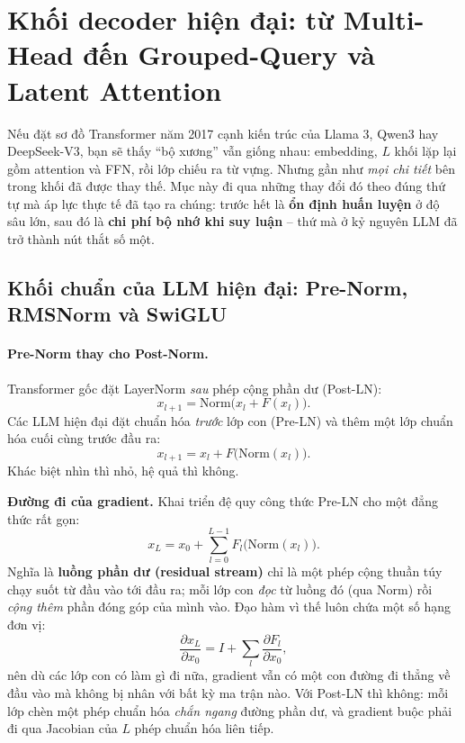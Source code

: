 
\section{Khối decoder hiện đại: từ Multi-Head đến Grouped-Query và Latent Attention}
\label{sec:modern_decoder_attention}

Nếu đặt sơ đồ Transformer năm 2017 cạnh kiến trúc của Llama 3, Qwen3 hay DeepSeek-V3, bạn sẽ thấy “bộ xương” vẫn giống nhau: embedding, $L$ khối lặp lại gồm attention và FFN, rồi lớp chiếu ra từ vựng. Nhưng gần như \emph{mọi chi tiết} bên trong khối đã được thay thế. Mục này đi qua những thay đổi đó theo đúng thứ tự mà áp lực thực tế đã tạo ra chúng: trước hết là \textbf{ổn định huấn luyện} ở độ sâu lớn, sau đó là \textbf{chi phí bộ nhớ khi suy luận} -- thứ mà ở kỷ nguyên LLM đã trở thành nút thắt số một.

\subsection{Khối chuẩn của LLM hiện đại: Pre-Norm, RMSNorm và SwiGLU}
\label{ssec:modern_block}

\paragraph{Pre-Norm thay cho Post-Norm.}
Transformer gốc đặt LayerNorm \emph{sau} phép cộng phần dư (Post-LN):
\[
x_{l+1} = \text{Norm}\big(x_l + F(x_l)\big).
\]
Các LLM hiện đại đặt chuẩn hóa \emph{trước} lớp con (Pre-LN) và thêm một lớp chuẩn hóa cuối cùng trước đầu ra:
\[
x_{l+1} = x_l + F\big(\text{Norm}(x_l)\big).
\]
Khác biệt nhìn thì nhỏ, hệ quả thì không.

\textbf{Đường đi của gradient.} Khai triển đệ quy công thức Pre-LN cho một đẳng thức rất gọn:
\[
x_L = x_0 + \sum_{l=0}^{L-1} F_l\big(\text{Norm}(x_l)\big) .
\]
Nghĩa là \textbf{luồng phần dư (residual stream)} chỉ là một phép cộng thuần túy chạy suốt từ đầu vào tới đầu ra; mỗi lớp con \emph{đọc} từ luồng đó (qua Norm) rồi \emph{cộng thêm} phần đóng góp của mình vào. Đạo hàm vì thế luôn chứa một số hạng đơn vị:
\[
\frac{\partial x_L}{\partial x_0} = I + \sum_{l} \frac{\partial F_l}{\partial x_0} ,
\]
nên dù các lớp con có làm gì đi nữa, gradient vẫn có một con đường đi thẳng về đầu vào mà không bị nhân với bất kỳ ma trận nào. Với Post-LN thì không: mỗi lớp chèn một phép chuẩn hóa \emph{chắn ngang} đường phần dư, và gradient buộc phải đi qua Jacobian của $L$ phép chuẩn hóa liên tiếp.

